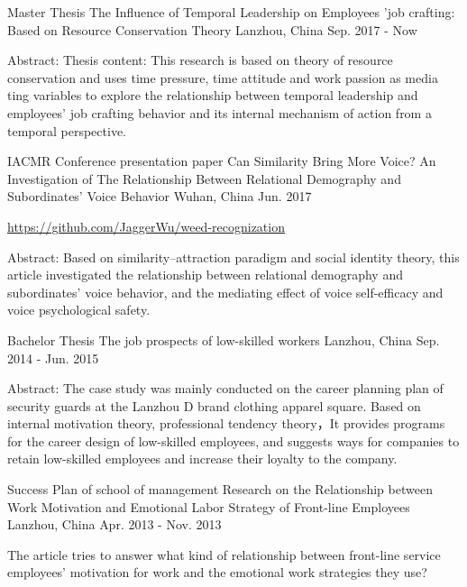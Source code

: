 \begin{cventries}
  \cventry
    {Master Thesis}
    {The Influence of Temporal Leadership on Employees 'job crafting: Based on Resource Conservation Theory}
    {Lanzhou, China}
    {Sep. 2017 - Now}
    {
      \begin{cvitems}
        \item {Abstract: Thesis content: This research is based on theory of resource conservation and uses time pressure, time attitude and work passion as media ting variables to explore the relationship between temporal leadership and employees’ job crafting behavior and its internal mechanism of action from a temporal perspective.}
      \end{cvitems}
     }
  \cventry
    {IACMR Conference presentation paper}
    {Can Similarity Bring More Voice? An Investigation of The Relationship Between Relational Demography and Subordinates' Voice Behavior}
    {Wuhan, China}
    {Jun. 2017}
    {
      \begin{cvitems}
        \item {\url{https://github.com/JaggerWu/weed-recognization}}
        \item {Abstract: Based on similarity–attraction paradigm and social identity theory, this article investigated the relationship between relational demography and subordinates' voice behavior, and the mediating effect of voice self-efficacy and voice psychological safety.}
      \end{cvitems}
     }
  \cventry
    {Bachelor Thesis}
    {The job prospects of low-skilled workers}
    {Lanzhou, China}
    {Sep. 2014 - Jun. 2015}
    {
      \begin{cvitems}
      \item {Abstract: The case study was mainly conducted on the career planning plan of security guards at the Lanzhou D brand clothing apparel square. Based on internal motivation theory, professional tendency theory，It provides programs for the career design of low-skilled employees, and suggests ways for companies to retain low-skilled employees and increase their loyalty to the company.}
      \end{cvitems}
    }
  \cventry
    {Success Plan of school of management}
    {Research on the Relationship between Work Motivation and Emotional Labor Strategy of Front-line Employees}
    {Lanzhou, China}
    {Apr. 2013 - Nov. 2013}
    {
      \begin{cvitems}
        \item {The article tries to answer what kind of relationship between front-line service employees' motivation for work and the emotional work strategies they use?}
      \end{cvitems} 
    }
\end{cventries}
